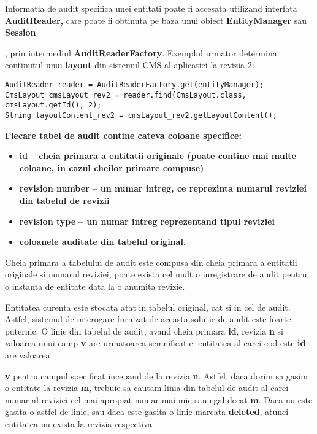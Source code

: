 \bigskip

Informatia de audit specifica unei entitati poate fi accesata utilizand interfata \textbf{AuditReader,} 
care poate fi obtinuta pe baza unui obiect \textbf{EntityManager} sau \textbf{Session}{, prin intermediul \textbf{AuditReaderFactory}.
Exemplul urmator determina continutul unui \textbf{layout} din sistemul CMS al aplicatiei la revizia 2:

\bigskip

\begin{lstlisting}[breaklines=true]
AuditReader reader = AuditReaderFactory.get(entityManager);
CmsLayout cmsLayout_rev2 = reader.find(CmsLayout.class, cmsLayout.getId(), 2);
String layoutContent_rev2 = cmsLayout_rev2.getLayoutContent();
\end{lstlisting}

\bigskip

\textbf{Fiecare tabel de audit contine cateva coloane specifice:}

\begin{itemize}
\item \textbf{id}\textbf{ -- cheia primara a entitatii originale (poate contine mai multe coloane, in cazul cheilor primare compuse)}
\item \textbf{revision number}\textbf{ -- un numar intreg, ce reprezinta numarul reviziei din tabelul de revizii}
\item \textbf{revision type}\textbf{ -- un numar intreg reprezentand tipul reviziei}
\item \textbf{coloanele auditate din tabelul original.}
\end{itemize}

\bigskip

Cheia primara a tabelului de audit este compusa din cheia primara a entitatii originale si numarul reviziei; poate exista cel mult o inregistrare de audit pentru o instanta de entitate data la o anumita revizie.

Entitatea curenta este stocata atat in tabelul original, cat si in cel de audit. 
Astfel, sistemul de interogare furnizat de aceasta solutie de audit este foarte puternic. 
O linie din tabelul de audit, avand cheia primara \textbf{id}, revizia \textbf{n} si valoarea unui camp \textbf{v} are urmatoarea semnificatie: 
entitatea al carei cod este \textbf{id} are valoarea}\textbf{v} pentru campul specificat incepand de la revizia \textbf{n}.
Astfel, daca dorim sa gasim o entitate la revizia \textbf{m}, 
trebuie sa cautam linia din tabelul de audit al carei numar al reviziei cel mai apropiat numar mai mic sau egal decat \textbf{m}. 
Daca nu este gasita o astfel de linie, sau daca este gasita o linie marcata \textbf{deleted}, atunci entitatea nu exista la revizia respectiva.

